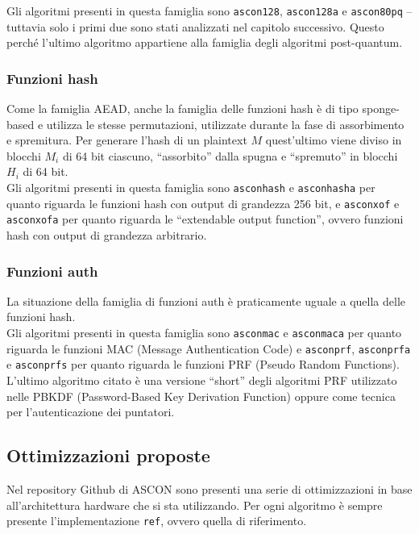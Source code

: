 \noindent Gli algoritmi presenti in questa famiglia sono \texttt{ascon128}, \texttt{ascon128a} e \texttt{ascon80pq} – tuttavia solo i primi due sono stati analizzati nel capitolo successivo. Questo perché l'ultimo algoritmo appartiene alla famiglia degli algoritmi post-quantum.

\subsubsection{Funzioni hash}

Come la famiglia AEAD, anche la famiglia delle funzioni hash è di tipo sponge-based e utilizza le stesse permutazioni, utilizzate durante la fase di assorbimento e spremitura. Per generare l'hash di un plaintext $M$ quest'ultimo viene diviso in blocchi $M_i$ di 64 bit ciascuno, ``assorbito'' dalla spugna e ``spremuto'' in blocchi $H_i$ di 64 bit. \\

\noindent Gli algoritmi presenti in questa famiglia sono \texttt{asconhash} e \texttt{asconhasha} per quanto riguarda le funzioni hash con output di grandezza 256 bit, e \texttt{asconxof} e \texttt{asconxofa} per quanto riguarda le ``extendable output function'', ovvero funzioni hash con output di grandezza arbitrario\cite{ascon-specification}.

\subsubsection{Funzioni auth}

La situazione della famiglia di funzioni auth è praticamente uguale a quella delle funzioni hash. \\

\noindent Gli algoritmi presenti in questa famiglia sono \texttt{asconmac} e \texttt{asconmaca} per quanto riguarda le funzioni MAC (Message Authentication Code) e \texttt{asconprf}, \texttt{asconprfa} e \texttt{asconprfs} per quanto riguarda le funzioni PRF (Pseudo Random Functions)\cite{ascon-specification-pdf}. L'ultimo algoritmo citato è una versione ``short'' degli algoritmi PRF utilizzato nelle PBKDF (Password-Based Key Derivation Function) oppure come tecnica per l'autenticazione dei puntatori.

\subsection{Ottimizzazioni proposte}

Nel repository Github di ASCON sono presenti una serie di ottimizzazioni in base all'architettura hardware che si sta utilizzando. Per ogni algoritmo è sempre presente l'implementazione \texttt{ref}, ovvero quella di riferimento. \\

